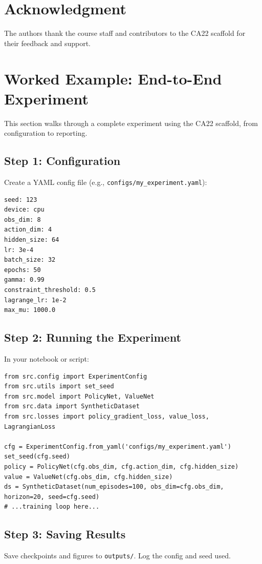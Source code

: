\documentclass[conference]{IEEEtran}
\begin{document}
\section*{Acknowledgment}
The authors thank the course staff and contributors to the CA22 scaffold for their feedback and support.




\section{Worked Example: End-to-End Experiment}
This section walks through a complete experiment using the CA22 scaffold, from configuration to reporting.

\subsection{Step 1: Configuration}
Create a YAML config file (e.g., \texttt{configs/my\_experiment.yaml}):
\begin{verbatim}
seed: 123
device: cpu
obs_dim: 8
action_dim: 4
hidden_size: 64
lr: 3e-4
batch_size: 32
epochs: 50
gamma: 0.99
constraint_threshold: 0.5
lagrange_lr: 1e-2
max_mu: 1000.0
\end{verbatim}

\subsection{Step 2: Running the Experiment}
In your notebook or script:
\begin{verbatim}
from src.config import ExperimentConfig
from src.utils import set_seed
from src.model import PolicyNet, ValueNet
from src.data import SyntheticDataset
from src.losses import policy_gradient_loss, value_loss, LagrangianLoss

cfg = ExperimentConfig.from_yaml('configs/my_experiment.yaml')
set_seed(cfg.seed)
policy = PolicyNet(cfg.obs_dim, cfg.action_dim, cfg.hidden_size)
value = ValueNet(cfg.obs_dim, cfg.hidden_size)
ds = SyntheticDataset(num_episodes=100, obs_dim=cfg.obs_dim, horizon=20, seed=cfg.seed)
# ...training loop here...
\end{verbatim}

\subsection{Step 3: Saving Results}
Save checkpoints and figures to \texttt{outputs/}. Log the config and seed used.
\end{document}
